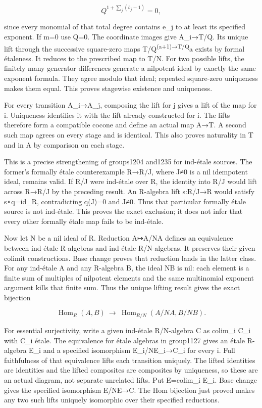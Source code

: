 \[
Q^{1+\sum_j(b_j-1)}=0,
\]

since every monomial of that total degree contains e\_j to at least its specified exponent. If m=0 use Q=0. The coordinate images give A\_i→T/Q. Its unique lift through the successive square-zero maps T/Q\textsuperscript{(a+1)→T/Q}a exists by formal étaleness. It reduces to the prescribed map to T/N. For two possible lifts, the finitely many generator differences generate a nilpotent ideal by exactly the same exponent formula. They agree modulo that ideal; repeated square-zero uniqueness makes them equal. This proves stagewise existence and uniqueness.

For every transition A\_i→A\_j, composing the lift for j gives a lift of the map for i. Uniqueness identifies it with the lift already constructed for i. The lifts therefore form a compatible cocone and define an actual map A→T. A second such map agrees on every stage and is identical. This also proves naturality in T and in A by comparison on each stage.

This is a precise strengthening of groups1204 and1235 for ind-étale sources. The former's formally étale counterexample R→R/J, where J≠0 is a nil idempotent ideal, remains valid. If R/J were ind-étale over R, the identity into R/J would lift across R→R/J by the preceding result. An R-algebra lift s:R/J→R would satisfy s∘q=id\_R, contradicting q(J)=0 and J≠0. Thus that particular formally étale source is not ind-étale. This proves the exact exclusion; it does not infer that every other formally étale map fails to be ind-étale.

Now let N be a nil ideal of R. Reduction A↦A/NA defines an equivalence between ind-étale R-algebras and ind-étale R/N-algebras. It preserves their given colimit constructions. Base change proves that reduction lands in the latter class. For any ind-étale A and any R-algebra B, the ideal NB is nil: each element is a finite sum of multiples of nilpotent elements and the same multinomial exponent argument kills that finite sum. Thus the unique lifting result gives the exact bijection

\[
\operatorname{Hom}_R(A,B)
 \ \longrightarrow\
\operatorname{Hom}_{R/N}(A/NA,B/NB).
\]

For essential surjectivity, write a given ind-étale R/N-algebra C as colim\_i C\_i with C\_i étale. The equivalence for étale algebras in group1127 gives an étale R-algebra E\_i and a specified isomorphism E\_i/NE\_i→C\_i for every i. Full faithfulness of that equivalence lifts each transition uniquely. The lifted identities are identities and the lifted composites are composites by uniqueness, so these are an actual diagram, not separate unrelated lifts. Put E=colim\_i E\_i. Base change gives the specified isomorphism E/NE→C. The Hom bijection just proved makes any two such lifts uniquely isomorphic over their specified reductions.

